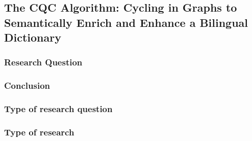 \documentclass[a4paper, 10pt]{article}
\begin{document}
\subsection{The CQC Algorithm: Cycling in Graphs to Semantically Enrich and Enhance a Bilingual Dictionary}
\subsubsection*{Research Question}

\subsubsection*{Conclusion}

\subsubsection*{Type of research question}

\subsubsection*{Type of research}
\end{document}
